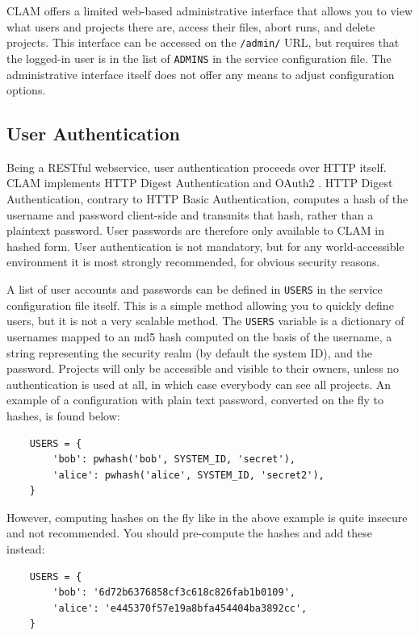 \documentclass[a4paper,12pt,twoside,openright]{report}
\begin{document}
CLAM offers a limited web-based administrative interface that allows you to
view what users and projects there are,  access their files, abort runs, and
delete projects. This interface can be accessed on the \texttt{/admin/} URL,
but requires that the logged-in user is in the list of \texttt{ADMINS} in the
service configuration file. The administrative interface itself does not offer
any means to adjust configuration options.

\subsection{User Authentication}

Being a RESTful webservice, user authentication proceeds over HTTP itself. CLAM
implements HTTP Digest Authentication \cite{HTTPAUTH} and OAuth2 \cite{OAUTH2}. HTTP Digest
Authentication, contrary to HTTP Basic Authentication, computes a hash of the
username and password client-side and transmits that hash, rather than a
plaintext password. User passwords are therefore only available to CLAM in
hashed form. User authentication is not mandatory, but for any world-accessible
environment it is most strongly recommended, for obvious security reasons. 

A list of user accounts and passwords can be defined in \texttt{USERS} in the
service configuration file itself. This is a simple method allowing you to
quickly define users, but it is not a very scalable method. The \texttt{USERS}
variable is a dictionary of usernames mapped to an md5 hash computed on the
basis of the username, a string representing the security realm (by default the
system ID), and the password. Projects will only be accessible and visible to
their owners, unless no authentication is used at all, in which case everybody
can see all projects. An example of a configuration with plain text password,
converted on the fly to hashes, is found below:

{ \small
\begin{verbatim}
    USERS = {
        'bob': pwhash('bob', SYSTEM_ID, 'secret'), 
        'alice': pwhash('alice', SYSTEM_ID, 'secret2'),
    }
\end{verbatim}
}

However, computing hashes on the fly like in the above example is quite
insecure and not recommended. You should pre-compute the hashes and add these
instead:

{ \small
\begin{verbatim}
    USERS = {
        'bob': '6d72b6376858cf3c618c826fab1b0109',
        'alice': 'e445370f57e19a8bfa454404ba3892cc',
    }
\end{verbatim}
}
\end{document}
